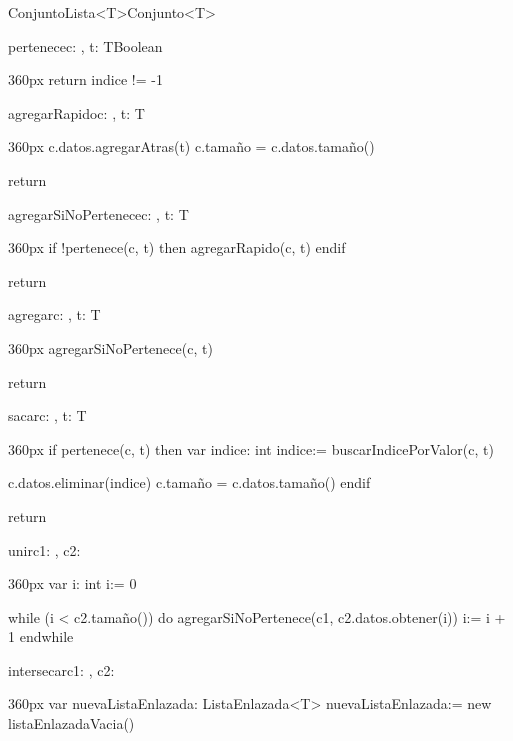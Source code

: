 \documentclass[10pt,a4paper]{article}
\begin{document}
\begin{ModuloImplements}{ConjuntoLista<T>}{Conjunto<T>}
\begin{proc}{pertenece}{\In c: , \In t: T}{Boolean}
\begin{ImplementationCode}{360px}
      return indice != -1
    \end{ImplementationCode}
  \end{proc}
  \begin{proc}{agregarRapido}{\Inout c: , \In t: T}{}
    \begin{ImplementationCode}{360px}
      c.datos.agregarAtras(t)
      c.tamaño = c.datos.tamaño()

      return
    \end{ImplementationCode}
  \end{proc}
  \begin{proc}{agregarSiNoPertenece}{\Inout c: , \In t: T}{}
    \begin{ImplementationCode}{360px}
      if !pertenece(c, t) then
        agregarRapido(c, t)
      endif

      return
    \end{ImplementationCode}
  \end{proc}
  \begin{proc}{agregar}{\Inout c: , \In t: T}{}
    \begin{ImplementationCode}{360px}
      agregarSiNoPertenece(c, t)

      return
    \end{ImplementationCode}
  \end{proc}
  \begin{proc}{sacar}{\Inout c: , \In t: T}{}
    \begin{ImplementationCode}{360px}
      if pertenece(c, t) then
        var indice: int
            indice:= buscarIndicePorValor(c, t)

        c.datos.eliminar(indice)
        c.tamaño = c.datos.tamaño()
      endif

      return
    \end{ImplementationCode}
  \end{proc}
  \begin{proc}{unir}{\Inout c1: , \Inout c2: }{}
    \begin{ImplementationCode}{360px}
      var i: int
          i:= 0
      
      while (i < c2.tamaño()) do
        agregarSiNoPertenece(c1, c2.datos.obtener(i))
        i:= i + 1
      endwhile
    \end{ImplementationCode}
  \end{proc}
  \begin{proc}{intersecar}{\Inout c1: , \In c2: }{}
    \begin{ImplementationCode}{360px}
      var nuevaListaEnlazada: ListaEnlazada<T>
          nuevaListaEnlazada:= new listaEnlazadaVacia()


\end{ImplementationCode}
\end{proc}
\end{ModuloImplements}
\end{document}
